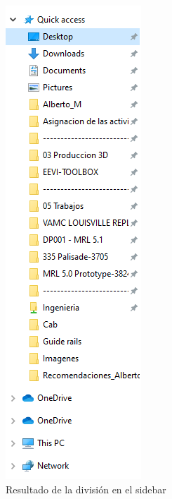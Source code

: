 \documentclass{report}
\begin{document}
\begin{figure}[H]
	\centering
	\includegraphics[width=0.75\linewidth, height=0.75\textheight,keepaspectratio]{Imagenes/fe_division_03}
	\caption{Resultado de la división en el sidebar}
	\label{fig:fedivision03}
\end{figure}
\end{document}
